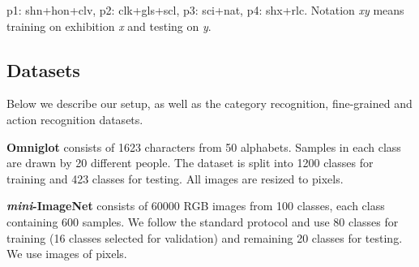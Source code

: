 {\begin{table*}[t]
\centering
\caption{Evaluations on the Open MIC dataset (Protocol I) (5-way 1-shot accuracy). }
\label{table_o1}
p1: shn+hon+clv, p2: clk+gls+scl, p3: sci+nat, p4: shx+rlc. Notation {\em xy} means training on exhibition {\em x} and testing on {\em y}.
\end{table*}
}

\subsection{Datasets}
Below we describe our setup, as well as the category recognition, fine-grained and action recognition datasets.

\vspace{0.05cm}
\noindent\textbf{Omniglot } \cite{lake_oneshot} consists of 1623 characters  from 50 alphabets. Samples in each class are drawn by 20 different people. The dataset is split into 1200 classes for training and 423 classes for testing. All images are resized to  pixels.

\vspace{0.05cm}
\noindent\textbf{\textit{mini}-ImageNet} \cite{vinyals2016matching} consists of 60000 RGB images from 100 classes, each class containing 600 samples. 
We follow the standard protocol \cite{vinyals2016matching} and use 80 classes for training (16 classes selected for validation) and remaining 20 classes for testing. We  use images of  pixels.



